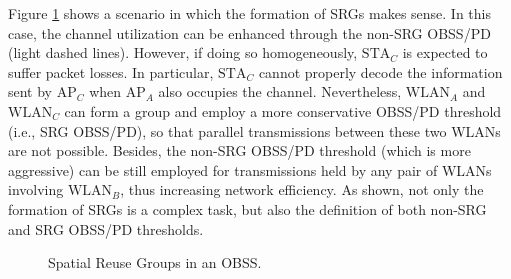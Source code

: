 \documentclass[preprint,12pt]{elsarticle}
\begin{document}
	Figure \ref{fig:fig_6} shows a scenario in which the formation of SRGs makes sense. In this case, the channel utilization can be enhanced through the non-SRG OBSS/PD (light dashed lines). However, if doing so homogeneously, $\text{STA}_C$ is expected to suffer packet losses. In particular, $\text{STA}_C$ cannot properly decode the information sent by $\text{AP}_C$ when $\text{AP}_A$ also occupies the channel. Nevertheless, $\text{WLAN}_A$ and $\text{WLAN}_C$ can form a group and employ a more conservative OBSS/PD threshold (i.e., SRG OBSS/PD), so that parallel transmissions between these two WLANs are not possible. Besides, the non-SRG OBSS/PD threshold (which is more aggressive) can be still employed for transmissions held by any pair of WLANs involving $\text{WLAN}_B$, thus increasing network efficiency. As shown, not only the formation of SRGs is a complex task, but also the definition of both non-SRG and SRG OBSS/PD thresholds.
	
	\begin{figure}[ht!]
		\centering
		\caption{Spatial Reuse Groups in an OBSS.}
		\label{fig:fig_6}
	\end{figure}
	
\end{document}

